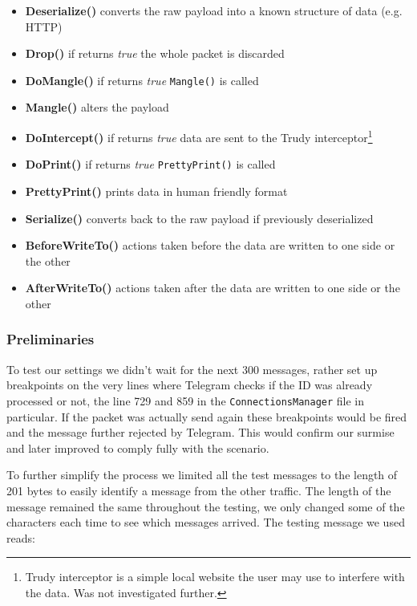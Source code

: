 \documentclass[thesis=M,english]{FITthesis}[2012/10/20]
\begin{document}
\begin{itemize}
	\item \textbf{Deserialize()} converts the raw payload into a known structure of data (e.g. HTTP)
	\item \textbf{Drop()} if returns \emph{true} the whole packet is discarded
	\item \textbf{DoMangle()} if returns \emph{true} \texttt{Mangle()} is called
	\item \textbf{Mangle()} alters the payload
	\item \textbf{DoIntercept()} if returns \emph{true} data are sent to the Trudy interceptor\footnote{Trudy interceptor is a simple local website the user may use to interfere with the data. Was not investigated further.}
	\item \textbf{DoPrint()} if returns \emph{true} \texttt{PrettyPrint()} is called
	\item \textbf{PrettyPrint()} prints data in human friendly format
	\item \textbf{Serialize()} converts back to the raw payload if previously deserialized
	\item \textbf{BeforeWriteTo()} actions taken before the data are written to one side or the other
	\item \textbf{AfterWriteTo()} actions taken after the data are written to one side or the other

\end{itemize}


\subsubsection{Preliminaries}

To test our settings we didn't wait for the next 300 messages, rather set up breakpoints on the very lines where Telegram checks if the ID was already processed or not, the line 729 and 859 in the \texttt{ConnectionsManager} file in particular. If the packet was actually send again these breakpoints would be fired and the message further rejected by Telegram. This would confirm our surmise and later improved to comply fully with the scenario.

To further simplify the process we limited all the test messages to the length of 201 bytes to easily identify a message from the other traffic. The length of the message remained the same throughout the testing, we only changed some of the characters each time to see which messages arrived. The testing message we used reads:
\end{document}

